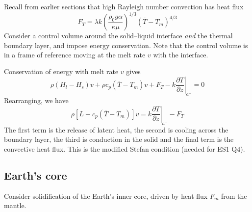 \documentclass{jknotes}
\begin{document}
Recall from earlier sections that high Rayleigh number convection has heat
flux
\begin{equation}
	F_T = \lambda k \left( \frac{\rho_0 g \alpha}{\kappa \mu}\right)^{1/3}
	\left( \overline{T} - T_m\right)^{4/3}
\end{equation}
Consider a control volume around the solid--liquid interface \emph{and} the
thermal boundary layer, and impose energy conservation. Note that the control
volume is in a frame of reference moving at the melt rate $v$ with the
interface.
\begin{center}
\end{center}

Conservation of energy with melt rate $v$ gives
\begin{equation}
	\rho (H_l - H_s)v + \rho c_p (\overline{T}-T_m)v + F_T - k \left.\frac{\partial
	T}{\partial z}\right|_{a^-} = 0
\end{equation}
Rearranging, we have
\begin{equation}
	\rho \left[ L + c_p(\overline{T}-T_m)\right] v = k \left.\frac{\partial
	T}{\partial z}\right|_{a^-} - F_T
\end{equation}
The first term is the release of latent heat, the second is cooling across the
boundary layer, the third is conduction in the solid and the final term is the
convective heat flux. This is the modified Stefan condition (needed for ES1
Q4).

\subsection{Earth's core}
Consider solidification of the Earth's inner core, driven by heat flux $F_m$
from the mantle. 
\end{document}
